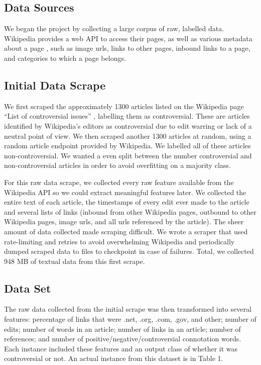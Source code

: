 \documentclass{article}
\begin{document}
\subsection{Data Sources}

We began the project by collecting a large corpus of raw, labelled data. Wikipedia provides a web API to access their pages, as well as various metadata about a page \cite{apiMain}, such as image urls, links to other pages, inbound links to a page, and categories to which a page belongs. 

\subsection{Initial Data Scrape}

We first scraped the approximately 1300 articles listed on the Wikipedia page “List of controversial issues” \cite{controversialPages}, labelling them as controversial. These are articles identified by Wikipedia’s editors as controversial due to edit warring or lack of a neutral point of view. We then scraped another 1300 articles at random, using a random article endpoint provided by Wikipedia. We labelled all of these articles non-controversial. We wanted a even split between the number controversial and non-controversial articles in order to avoid overfitting on a majority class.

For this raw data scrape, we collected every raw feature available from the Wikipedia API so we could extract meaningful features later. We collected the entire text of each article, the timestamps of every edit ever made to the article and several lists of links (inbound from other Wikipedia pages, outbound to other Wikipedia pages, image urls, and all urls referenced by the article). The sheer amount of data collected made scraping difficult. We wrote a scraper that used rate-limiting and retries to avoid overwhelming Wikipedia and periodically dumped scraped data to files to checkpoint in case of failures. Total, we collected 948 MB of textual data from this first scrape.

\subsection{Data Set}

The raw data collected from the initial scrape was then transformed into several features: percentage of links that were .net, .org, .com, .gov, and other; number of edits; number of words in an article; number of links in an article; number of references; and number of positive/negative/controversial connotation words.  Each instance included these features and an output class of whether it was controversial or not. An actual instance from this dataset is in Table 1.
\end{document}

